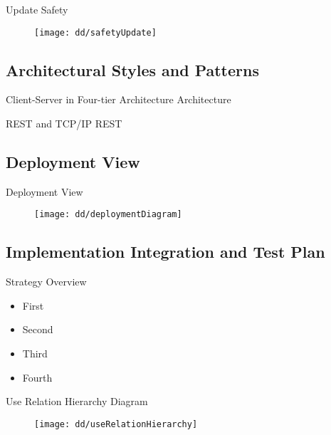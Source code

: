 		\begin{frame}{Update Safety}
			\begin{figure}[hbtp]
				\centering
				\texttt{[image: dd/safetyUpdate]}
			\end{figure}
		\end{frame}
	
	\subsection{Architectural Styles and Patterns}
		\begin{frame}{Client-Server in Four-tier Architecture}
			Architecture
		\end{frame}
	
		\begin{frame}{REST and TCP/IP}
			REST
		\end{frame}
		
	\subsection{Deployment View}
		\begin{frame}{Deployment View}
			\begin{figure}[hbtp]
				\vspace{-10pt}
				\centering
				\texttt{[image: dd/deploymentDiagram]}
			\end{figure}
		\end{frame}
	
	\subsection{Implementation Integration and Test Plan}
		\begin{frame}{Strategy Overview}
			\begin{itemize}
				\item First
				\item Second
				\item Third
				\item Fourth
			\end{itemize}
		\end{frame}
	
		\begin{frame}{Use Relation Hierarchy Diagram}
			\begin{figure}
				\vspace{-10pt}
				\centering
				\texttt{[image: dd/useRelationHierarchy]}
			\end{figure}
		\end{frame}